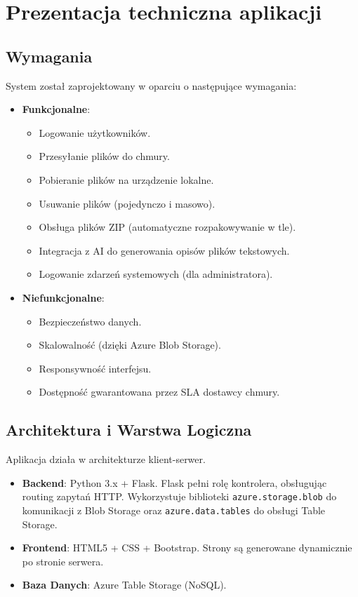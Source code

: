 \documentclass[12pt,a4paper]{article}
\begin{document}
	\newpage
	\section{Prezentacja techniczna aplikacji}
	
	\subsection{Wymagania}
	System został zaprojektowany w oparciu o następujące wymagania:
	\begin{itemize}
		\item \textbf{Funkcjonalne}:
		\begin{itemize}
			\item Logowanie użytkowników.
			\item Przesyłanie plików do chmury.
			\item Pobieranie plików na urządzenie lokalne.
			\item Usuwanie plików (pojedynczo i masowo).
			\item Obsługa plików ZIP (automatyczne rozpakowywanie w tle).
			\item Integracja z AI do generowania opisów plików tekstowych.
			\item Logowanie zdarzeń systemowych (dla administratora).
		\end{itemize}
		\item \textbf{Niefunkcjonalne}:
		\begin{itemize}
			\item Bezpieczeństwo danych.
			\item Skalowalność (dzięki Azure Blob Storage).
			\item Responsywność interfejsu.
			\item Dostępność gwarantowana przez SLA dostawcy chmury.
		\end{itemize}
	\end{itemize}
	
	\subsection{Architektura i Warstwa Logiczna}
	Aplikacja działa w architekturze klient-serwer.
	\begin{itemize}
		\item \textbf{Backend}: Python 3.x + Flask. Flask pełni rolę kontrolera, obsługując routing zapytań HTTP. Wykorzystuje biblioteki \texttt{azure.storage.blob} do komunikacji z Blob Storage oraz \texttt{azure.data.tables} do obsługi Table Storage.
		\item \textbf{Frontend}: HTML5 + CSS + Bootstrap. Strony są generowane dynamicznie po stronie serwera.
		\item \textbf{Baza Danych}: Azure Table Storage (NoSQL).
	\end{itemize}
	
\end{document}

